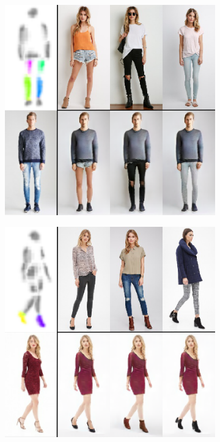 \begin{figure}[t]
\begin{subfigure}{0.24\linewidth}
		\label{fig:part3_11}
		\end{subfigure}
		\begin{subfigure}{0.24\linewidth}
		\centering
		\includegraphics[trim={0cm 0cm 0cm 0cm},clip, width=1.\linewidth]{fig/part_legs}\caption{}
		\label{fig:part3_21}
		\end{subfigure}
		\begin{subfigure}{0.24\linewidth}
		\centering
		\includegraphics[trim={0cm 0cm 0cm 0cm},clip, width=1.\linewidth]{fig/part_shoe}\caption{}

\end{subfigure}
\end{figure}
